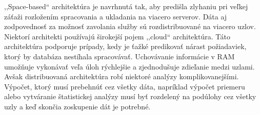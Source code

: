 \begin{itemize}
 \indent ,,Space-based`` architektúra je navrhnutá tak, aby predišla zlyhaniu pri veľkej záťaži rozložením spracovania a ukladania na viacero serverov. Dáta aj zodpovednosť za možnosť zavolania služby sú rozdistribuované na viacero uzlov. Niektorí architekti používajú širokejší pojem ,,cloud`` architektúra. Táto architektúra podporuje prípady, kedy je ťažké predikovať nárast požiadaviek, ktorý by databáza nestíhala spracovávať. 
\indent Uchovávanie informácie v RAM umožňuje vykonávať veľa úloh rýchlejšie a zjednodušuje zdieľanie medzi uzlami. Avšak distribuovaná architektúra robí niektoré analýzy komplikovanejšími. Výpočet, ktorý musí prebehnúť cez všetky dáta, napríklad výpočet priemeru alebo vytváranie štatistickej analýzy musí byť rozdelený na podúlohy cez všetky uzly a keď skončia zoskupenie dát je potrebné. 
\end{itemize}

